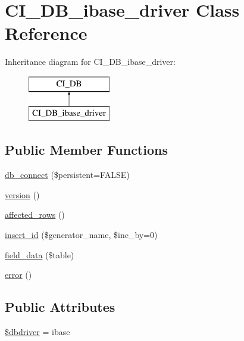 \hypertarget{class_c_i___d_b__ibase__driver}{}\section{C\+I\+\_\+\+D\+B\+\_\+ibase\+\_\+driver Class Reference}
\label{class_c_i___d_b__ibase__driver}
Inheritance diagram for C\+I\+\_\+\+D\+B\+\_\+ibase\+\_\+driver\+:\begin{figure}[H]
\begin{center}
\leavevmode
\includegraphics[height=2.000000cm]{class_c_i___d_b__ibase__driver}
\end{center}
\end{figure}
\subsection*{Public Member Functions}
\begin{DoxyCompactItemize}
\item 
\mbox{\hyperlink{class_c_i___d_b__ibase__driver_a52bf595e79e96cc0a7c907a9b45aeb4d}{db\+\_\+connect}} (\$persistent=F\+A\+L\+SE)
\item 
\mbox{\hyperlink{class_c_i___d_b__ibase__driver_a6080dae0886626b9a4cedb29240708b1}{version}} ()
\item 
\mbox{\hyperlink{class_c_i___d_b__ibase__driver_a77248aaad33eb132c04cc4aa3f4bc8cb}{affected\+\_\+rows}} ()
\item 
\mbox{\hyperlink{class_c_i___d_b__ibase__driver_a148521f11a2aad9f228af62f59ec5130}{insert\+\_\+id}} (\$generator\+\_\+name, \$inc\+\_\+by=0)
\item 
\mbox{\hyperlink{class_c_i___d_b__ibase__driver_a90355121e1ed009e0efdbd544ab56efa}{field\+\_\+data}} (\$table)
\item 
\mbox{\hyperlink{class_c_i___d_b__ibase__driver_a43b8d30b879d4f09ceb059b02af2bc02}{error}} ()
\end{DoxyCompactItemize}
\subsection*{Public Attributes}
\begin{DoxyCompactItemize}
\item 
\mbox{\hyperlink{class_c_i___d_b__ibase__driver_a0cde2a16322a023d040aa7f725877597}{\$dbdriver}} = \textquotesingle{}ibase\textquotesingle{}
\end{DoxyCompactItemize}
